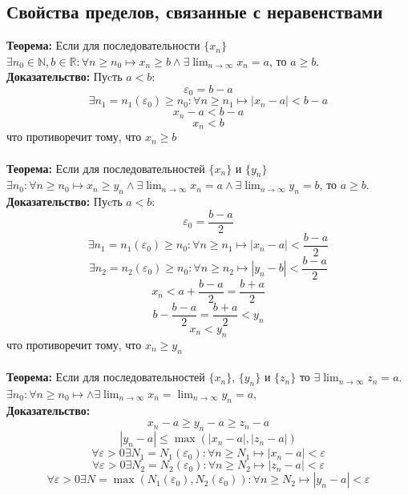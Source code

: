 \documentclass{article}
\begin{document}
    \subsection*{Свойства  пределов,  связанные  с неравенствами}
        \textbf{Теорема:} Если для последовательности $\{x_n\}$
        $\exists n_0 \in \mathbb{N}, b \in \mathbb{R}: \forall n \ge n_0 \longmapsto x_n \ge b \wedge \exists \lim_{n\to\infty} x_n = a$, то $a \ge b$.
        \\
        \textbf{Доказательство:}
        Пуcть $a < b$:
        \[ \varepsilon_0 = b - a \]
        \[ \exists n_1 = n_1(\varepsilon_0) \ge n_0: \forall n \ge n_1 \longmapsto |x_n - a| < b - a \]
        \[ x_n - a < b - a \]
        \[ x_n < b \]
        что противоречит тому, что $x_n \ge b $
        \\
        \\
        \textbf{Теорема:} Если для последовательностей $\{x_n\}$ и $\{y_n\}$
        $\exists n_0: \forall n \ge n_0 \longmapsto x_n \ge y_n \wedge \exists \lim_{n\to\infty} x_n = a \wedge \exists \lim_{n\to\infty} y_n = b$, то $a \ge b$.
        \\
        \textbf{Доказательство:}
        Пуcть $a < b$:
        \[ \varepsilon_0 = \frac{b - a}{2} \]
        \[ \exists n_1 = n_1(\varepsilon_0) \ge n_0: \forall n \ge n_1 \longmapsto |x_n - a| < \frac{b - a}{2} \]
        \[ \exists n_2 = n_2(\varepsilon_0) \ge n_0: \forall n \ge n_2 \longmapsto |y_n - b| < \frac{b - a}{2} \]
        \[ x_n < a + \frac{b - a}{2} = \frac{b + a}{2} \]
        \[ b - \frac{b - a}{2} = \frac{b + a}{2} < y_n \]
        \[ x_n < y_n \]
        что противоречит тому, что $x_n \ge y_n $
        \\
        \\
        \textbf{Теорема:} Если для последовательностей $\{x_n\}$, $\{y_n\}$ и $\{z_n\}$
        то $\exists \lim_{n\to\infty} z_n = a$.
        $\exists n_0: \forall n \ge n_0 \longmapsto  \wedge \exists \lim_{n\to\infty} x_n = \lim_{n\to\infty} y_n = a$,
        \\
        \textbf{Доказательство:}
        \[ x_n - a \ge y_n - a \ge z_n - a \]
        \[ |y_n - a| \le \max(|x_n - a|, |z_n - a|) \]
        \[ \forall \varepsilon > 0 \exists N_1 = N_1(\varepsilon_0): \forall n \ge N_1 \longmapsto |x_n - a| < \varepsilon \]
        \[ \forall \varepsilon > 0 \exists N_2 = N_2(\varepsilon_0): \forall n \ge N_2 \longmapsto |z_n - a| < \varepsilon \]
        \[ \forall \varepsilon > 0 \exists N = \max(N_1(\varepsilon_0), N_2(\varepsilon_0)): \forall n \ge N_2 \longmapsto |y_n - a| < \varepsilon \]
    
\end{document}
